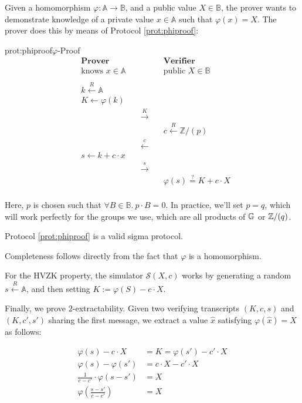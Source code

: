 Given a homomorphism $\varphi : \mathbb{A} \to \mathbb{B}$, and a public value
$X \in \mathbb{B}$, the prover wants to demonstrate knowledge of a private
value $x \in \mathbb{A}$ such that $\varphi(x) = X$. The prover
does this by means of Protocol \ref{prot:phiproof}:

\begin{aprotocol}{prot:phiproof}{$\varphi$-Proof}
\[
\begin{aligned}
    &\textbf{Prover}&&\textbf{Verifier}\\
    &\text{knows } x \in \mathbb{A}&&\text{public } X \in \mathbb{B}\\
    \\
    &k \xleftarrow{R} \mathbb{A}&\\
    &K \gets \varphi(k)&\\
    &&\quad\overset{K}{\longrightarrow}\quad\\
    &&&c \xleftarrow{R} \mathbb{Z}/(p)\\
    &&\quad\overset{c}{\longleftarrow}\quad\\
    &s \gets k + c \cdot x\\
    &&\quad\overset{s}{\longrightarrow}\quad\\
    &&& \varphi(s) \overset{?}{=} K + c \cdot X\\
\end{aligned}
\]
\end{aprotocol}

Here, $p$ is chosen such that $\forall B \in \mathbb{B}.\ p \cdot B = 0$.
In practice, we'll set $p = q$, which will work perfectly for the groups
we use, which are all products of $\mathbb{G}$ or $\mathbb{Z}/(q)$.

\begin{claim}
    Protocol \ref{prot:phiproof} is a valid sigma protocol.
\end{claim}

Completeness follows directly from the fact that $\varphi$ is a homomorphism.

For the HVZK property, the simulator $\mathcal{S}(X, c)$ works by generating
a random $s \xleftarrow{R} \mathbb{A}$, and then setting $K := \varphi(S) - c \cdot X$.

Finally, we prove $2$-extractability. Given two verifying transcripts
$(K, c, s)$ and $(K, c', s')$ sharing the first message, we extract
a value $\hat{x}$ satisfying $\varphi(\hat{x}) = X$ as follows:

$$
\begin{aligned}
\varphi(s) - c \cdot X &= K = \varphi(s') - c' \cdot X\\
\varphi(s) - \varphi(s') &= c \cdot X - c' \cdot X\\
\frac{1}{c - c'} \cdot \varphi(s - s') &= X\\
\varphi \left(\frac{s - s'}{c - c'}\right) &= X
\end{aligned}
$$

